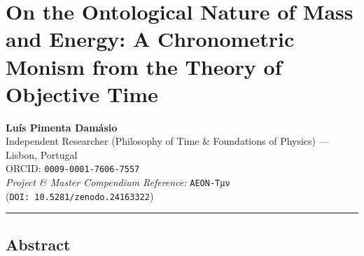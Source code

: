 \documentclass[
]{article}
\author{}
\date{}
\begin{document}
\section{On the Ontological Nature of Mass and Energy: A Chronometric
Monism from the Theory of Objective
Time}\label{on-the-ontological-nature-of-mass-and-energy-a-chronometric-monism-from-the-theory-of-objective-time}

\textbf{Luís Pimenta Damásio}\\
Independent Researcher (Philosophy of Time \& Foundations of Physics)
--- Lisbon, Portugal\\
ORCID: \texttt{0009-0001-7606-7557}\\
\emph{Project \& Master Compendium Reference:} \texttt{AEON-Tμν}
(\texttt{DOI:\ 10.5281/zenodo.24163322})

\begin{center}\rule{0.5\linewidth}{0.5pt}\end{center}

\subsection{Abstract}\label{abstract}
\end{document}

